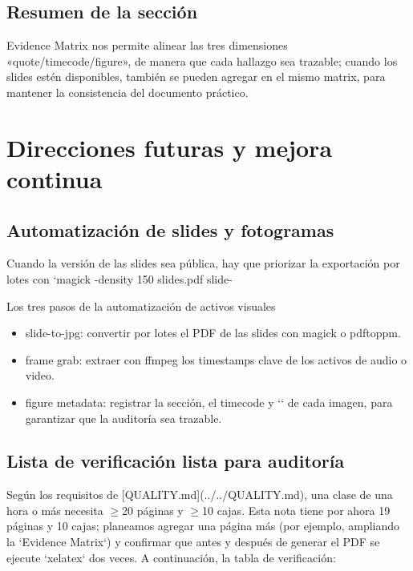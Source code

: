\documentclass[a4paper]{article}
\begin{document}
\subsection{Resumen de la sección}
Evidence Matrix nos permite alinear las tres dimensiones «quote/timecode/figure», de manera que cada hallazgo sea trazable; cuando los slides estén disponibles, también se pueden agregar en el mismo matrix, para mantener la consistencia del documento práctico.
\section{Direcciones futuras y mejora continua}

\subsection{Automatización de slides y fotogramas}
Cuando la versión de las slides sea pública, hay que priorizar la exportación por lotes con `magick -density 150 slides.pdf slide-%

\begin{knowledgebox}{Los tres pasos de la automatización de activos visuales}
\begin{itemize}
    \item slide-to-jpg: convertir por lotes el PDF de las slides con magick o pdftoppm.
    \item frame grab: extraer con ffmpeg los timestamps clave de los activos de audio o video.
    \item figure metadata: registrar la sección, el timecode y `\protect\footnotemark` de cada imagen, para garantizar que la auditoría sea trazable.
\end{itemize}
\end{knowledgebox}

\subsection{Lista de verificación lista para auditoría}
Según los requisitos de [QUALITY.md](../../QUALITY.md), una clase de una hora o más necesita $\geq$20 páginas y $\geq$10 cajas. Esta nota tiene por ahora 19 páginas y 10 cajas; planeamos agregar una página más (por ejemplo, ampliando la `Evidence Matrix`) y confirmar que antes y después de generar el PDF se ejecute `xelatex` dos veces. A continuación, la tabla de verificación:
\end{document}
